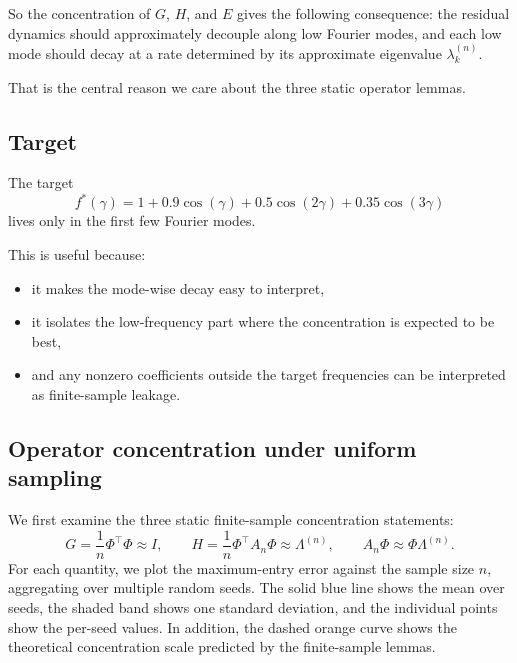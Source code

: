 \documentclass[11pt]{article}
\begin{document}
So the concentration of $G$, $H$, and $E$ gives the following consequence: the residual dynamics should approximately decouple along low Fourier modes, and each low mode should decay at a rate determined by its approximate eigenvalue $\lambda_k^{(n)}$.

That is the central reason we care about the three static operator lemmas.

\subsection{Target}

The target
$$
	f^*(\gamma)=1+0.9\cos(\gamma)+0.5\cos(2\gamma)+0.35\cos(3\gamma)
$$
lives only in the first few Fourier modes.

This is useful because:
\begin{itemize}
	\item it makes the mode-wise decay easy to interpret,
	\item it isolates the low-frequency part where the concentration is expected to be best,
	\item and any nonzero coefficients outside the target frequencies can be interpreted as finite-sample leakage.
\end{itemize}

\subsection{Operator concentration under uniform sampling}

We first examine the three static finite-sample concentration statements:
\[
	G=\frac{1}{n}\Phi^\top \Phi \approx I,
	\qquad
	H=\frac{1}{n}\Phi^\top A_n \Phi \approx \Lambda^{(n)},
	\qquad
	A_n\Phi \approx \Phi\Lambda^{(n)}.
\]
For each quantity, we plot the maximum-entry error against the sample size $n$, aggregating over multiple random seeds. The solid blue line shows the mean over seeds, the shaded band shows one standard deviation, and the individual points show the per-seed values. In addition, the dashed orange curve shows the theoretical concentration scale predicted by the finite-sample lemmas.
\end{document}
